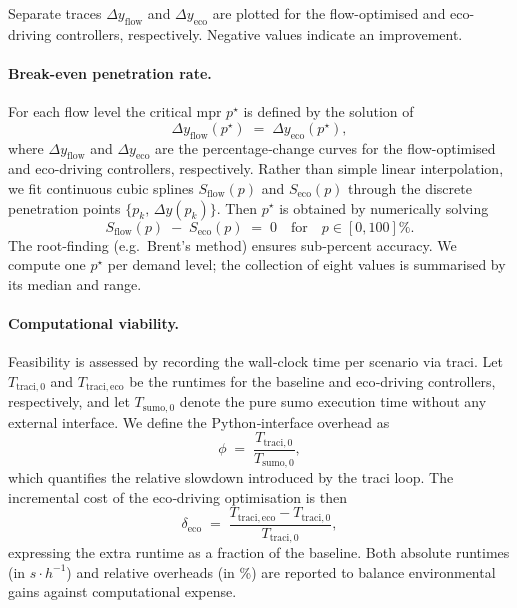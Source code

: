 Separate traces $\Delta y_{\mathrm{flow}}$ and $\Delta y_{\mathrm{eco}}$ are plotted for the flow-optimised and eco-driving controllers, respectively. Negative values indicate an improvement.  

\paragraph{Break-even penetration rate.}
For each flow level the critical \ac{mpr} $p^{\star}$ is defined by the solution of
\begin{equation}
    \Delta y_{\mathrm{flow}}(p^{\star})
    \;=\;
    \Delta y_{\mathrm{eco}}(p^{\star}),
\end{equation}
where $\Delta y_{\mathrm{flow}}$ and $\Delta y_{\mathrm{eco}}$ are the percentage‐change curves for the flow-optimised and eco-driving controllers, respectively. Rather than simple linear interpolation, we fit continuous cubic splines $S_{\mathrm{flow}}(p)$ and $S_{\mathrm{eco}}(p)$ through the discrete penetration points $\{p_{k},\,\Delta y(p_{k})\}$. Then $p^{\star}$ is obtained by numerically solving
\begin{equation}
    S_{\mathrm{flow}}(p)\;-\;S_{\mathrm{eco}}(p)\;=\;0
    \quad\text{for}\quad p\in[0,100]\%.
\end{equation}
The root‐finding (e.g.\ Brent’s method) ensures sub‐percent accuracy. We compute one $p^{\star}$ per demand level; the collection of eight values is summarised by its median and range.  

\paragraph{Computational viability.}
Feasibility is assessed by recording the wall‐clock time per scenario via \ac{traci}. Let $T_{\mathrm{traci,0}}$ and $T_{\mathrm{traci,eco}}$ be the runtimes for the baseline and eco‐driving controllers, respectively, and let $T_{\mathrm{sumo,0}}$ denote the pure \ac{sumo} execution time without any external interface. We define the Python‐interface overhead as
\begin{equation}
    \phi \;=\; \frac{T_{\mathrm{traci,0}}}{T_{\mathrm{sumo,0}}},
\end{equation}
which quantifies the relative slowdown introduced by the \ac{traci} loop. The incremental cost of the eco‐driving optimisation is then
\begin{equation}
    \delta_{\mathrm{eco}} 
    \;=\; \frac{T_{\mathrm{traci,eco}} - T_{\mathrm{traci,0}}}{T_{\mathrm{traci,0}}},
\end{equation}
expressing the extra runtime as a fraction of the baseline. Both absolute runtimes (in $s \cdot h^{-1}$) and relative overheads (in \%) are reported to balance environmental gains against computational expense.


